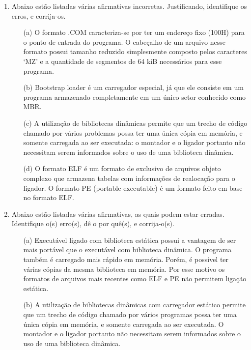 \begin{enumerate}
    \item
    Abaixo estão listadas várias afirmativas incorretas.
    Justificando, identifique os erros, e corrija-os.
    \begin{itemize}
        \item [(a)]
        O formato .COM caracteriza-se por ter um endereço fixo (100H)
        para o ponto de entrada do programa.
        O cabeçalho de um arquivo nesse formato possui tamanho reduzido simplesmente
        composto pelos caracteres `MZ' e 
        a quantidade de segmentos de 64 kiB necessários para esse programa.

        \item [(b)]
        Bootstrap loader é um carregador especial, já que ele consiste em um programa
        armazenado completamente em um único setor conhecido como MBR.

        \item [(c)]
        A utilização de bibliotecas dinâmicas permite que um trecho de código 
        chamado por vários problemas possa ter uma única cópia em memória,
        e somente carregada ao ser executada: 
        o montador e o ligador portanto não necessitam serem informados 
        sobre o uso de uma biblioteca dinâmica.

        \item [(d)]
        O formato ELF é um formato de exclusivo de arquivos objeto complexo 
        que armazena tabelas com informações de realocação para o ligador.
        O formato PE (portable executable) é um formato feito em base no formato ELF.
    \end{itemize} 

    \item 
    Abaixo estão listadas várias afirmativas, as quais podem estar erradas.
    Identifique o(s) erro(s), dê o por quê(s), e corrija-o(s).
    \begin{itemize}
        \item [(a)]
        Executável ligado com biblioteca estática 
        possui a vantagem de ser mais portável
        que o executável com biblioteca dinâmica.
        O programa também é carregado mais rápido em memória.
        Porém, é possível ter várias cópias da mesma biblioteca em memória.
        Por esse motivo os formatos de arquivos mais recentes 
        como ELF e PE não permitem ligação estática.

        \item [(b)]
        A utilização de bibliotecas dinâmicas com carregador estático 
        permite que um trecho de código chamado por vários programas 
        possa ter uma única cópia em memória, e somente carregada ao ser executada.
        O montador e o ligador portanto não necessitam 
        serem informados sobre o uso de uma biblioteca dinâmica. 
    \end{itemize}


\end{enumerate}
